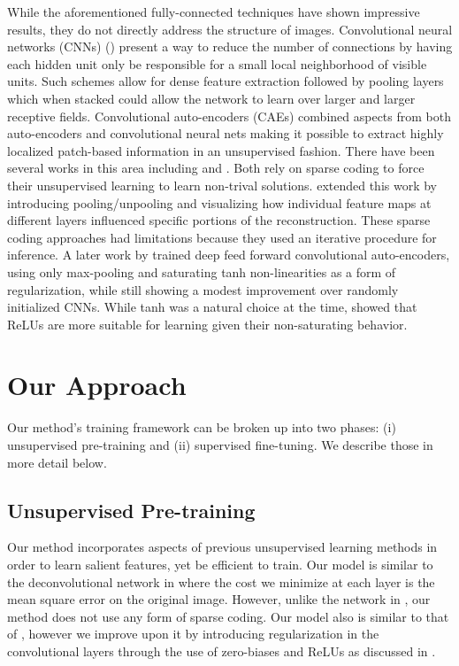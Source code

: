 \documentclass{article} \usepackage{iclr2015,times}
\begin{document}
While the aforementioned fully-connected techniques have shown impressive results, they do not directly address the structure of images. Convolutional neural networks (CNNs) (\citet{lecun1998gradient, lee2009convolutional}) present a way to reduce the number of connections by having each hidden unit only be responsible for a small local neighborhood of visible units. Such schemes allow for dense feature extraction followed by pooling layers which when stacked could allow the network to learn over larger and larger receptive fields. Convolutional auto-encoders (CAEs) combined aspects from both auto-encoders and convolutional neural nets making it possible to extract highly localized patch-based information in an unsupervised fashion. There have been several works in this area including \citet{jarrett2009best} and \citet{zeiler2010deconvolutional}. Both rely on sparse coding to force their unsupervised learning to learn non-trival solutions. \citet{zeiler2011adaptive} extended this work by introducing pooling/unpooling and visualizing how individual feature maps at different layers influenced specific portions of the reconstruction. These sparse coding approaches had limitations because they used an iterative procedure for inference. A later work by \citet{masci2011stacked} trained deep feed forward convolutional auto-encoders, using only max-pooling and saturating tanh non-linearities as a form of regularization, while still showing a modest improvement over randomly initialized CNNs. While tanh was a natural choice at the time, \citet{krizhevsky2012imagenet} showed that ReLUs are more suitable for learning given their non-saturating behavior.








 
\section{Our Approach}
\label{sec:method}
Our method's training framework can be broken up into two phases: (i) unsupervised pre-training and (ii) supervised fine-tuning. We describe those in more detail below.

\subsection{Unsupervised Pre-training}
Our method incorporates aspects of previous unsupervised learning methods in order to learn salient features, yet be efficient to train. Our model is similar to the deconvolutional network in \citet{zeiler2011adaptive} where the cost we minimize at each layer is the mean square error on the original image. However, unlike the network in \citet{zeiler2011adaptive}, our method does not use any form of sparse coding. Our model also is similar to that of \citet{masci2011stacked}, however we improve upon it by introducing regularization in the convolutional layers through the use of zero-biases and ReLUs as discussed in \citet{memisevic2014zero}. 
\end{document}
